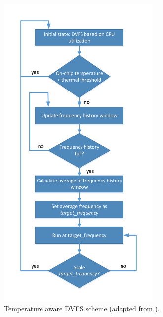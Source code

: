 \documentclass[journal]{IEEEtran}
\begin{document}
	\begin{figure}[h]
	   \centering
	   \includegraphics[width = 8cm]{DTM}
	   \caption{Temperature aware DVFS scheme (adapted from \cite{TempDVFS}).}
	   \label{Figure:DTM}
	\end{figure}	
	\FloatBarrier
\end{document}
